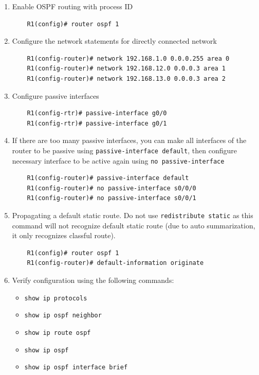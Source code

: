 \begin{enumerate}
\item Enable OSPF routing with process ID
	\begin{verbatim}
	R1(config)# router ospf 1
	\end{verbatim}
	
\item Configure the network statements for directly connected network
	\begin{verbatim}
	R1(config-router)# network 192.168.1.0 0.0.0.255 area 0 
	R1(config-router)# network 192.168.12.0 0.0.0.3 area 1 
	R1(config-router)# network 192.168.13.0 0.0.0.3 area 2
	\end{verbatim}
	
\item Configure passive interfaces
	\begin{verbatim} 
	R1(config-rtr)# passive-interface g0/0 
	R1(config-rtr)# passive-interface g0/1
	\end{verbatim}	

\item If there are too many passive interfaces, you can make all interfaces of the router to be passive using \verb|passive-interface default|, then configure necessary interface to be active again using \verb|no passive-interface|
	\begin{verbatim}
	R1(config-router)# passive-interface default
	R1(config-router)# no passive-interface s0/0/0
	R1(config-router)# no passive-interface s0/0/1
	\end{verbatim}		
	
\item Propagating a default static route. \note Do not use \verb|redistribute static| as this command will not recognize default static route (due to auto summarization, it only recognizes classful route).
	\begin{verbatim}
	R1(config)# router ospf 1
	R1(config-router)# default-information originate
	\end{verbatim}
	
\item Verify configuration using the following commands:
	\begin{itemize}
	\item \verb|show ip protocols|
	\item \verb|show ip ospf neighbor|
	\item \verb|show ip route ospf|
	\item \verb|show ip ospf|
	\item \verb|show ip ospf interface brief|
	\end{itemize}		
\end{enumerate}

